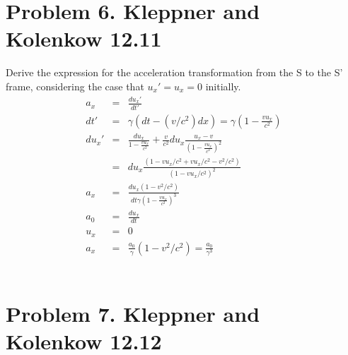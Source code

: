 \documentclass[11pt]{amsart}
\begin{document}
\section*{Problem 6. Kleppner and Kolenkow 12.11}
Derive the expression for the acceleration transformation from the S to the S' frame, considering the case that $u_{x}'=u_{x}=0$ initially. \\
\begin{eqnarray*}
a_{x} &=& \frac{du_{x}'}{dt'} \\
dt' &=& \gamma(dt-(v/c^{2})dx) = \gamma(1-\frac{vu_{x}}{c^{2}}) \\
du_{x}' &=& \frac{du_{x}}{1-\frac{vu_{x}}{c^{2}}}+\frac{v}{c^{2}}du_{x}\frac{u_{x}-v}{(1-\frac{vu_{x}}{c^{2}})^{2}} \\
&=& du_{x}\frac{(1-vu_{x}/c^{2}+vu_{x}/c^{2}-v^{2}/c^{2})}{(1-vu_{x}/c^{2})^{2}} \\
a_{x} &=& \frac{du_{x}(1-v^{2}/c^{2})}{dt\gamma(1-\frac{vu_{x}}{c^{2}})^{3}} \\
a_{0} &=& \frac{du_{x}}{dt} \\
u_{x} &=& 0 \\
a_{x} &=& \frac{a_{0}}{\gamma}(1-v^{2}/c^{2}) = \frac{a_{0}}{\gamma^{3}} 
\end{eqnarray*} \\

\section*{Problem 7. Kleppner and Kolenkow 12.12}
\end{document}
